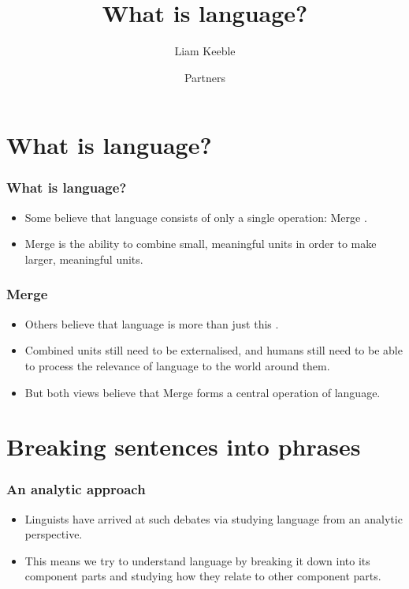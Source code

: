 \documentclass{beamer}
\title{What is language?}
\author{Liam Keeble}
\date{Partners}
\begin{document}
\begin{frame}
\maketitle
\end{frame}

\section{What is language?}

\begin{frame}
	\frametitle{What is language?}
	\begin{itemize}
		\item Some believe that language consists of only a single operation: Merge \cite{hauser2002faculty}.
		\item Merge is the ability to combine small, meaningful units in order to make larger, meaningful units.
		

	\end{itemize}

\end{frame}


\begin{frame}
	\frametitle{Merge}
	\begin{itemize}
		\item Others believe that language is more than just this \cite{jackendoff2005nature}.
	\item Combined units still need to be externalised, and humans still need to be able to process the relevance of language to the world around them.
	\item But both views believe that Merge forms a central operation of language.
	\end{itemize}

\end{frame}


\section{Breaking sentences into phrases}

\begin{frame}
	\frametitle{An analytic approach}
	\begin{itemize}
	\item Linguists have arrived at such debates via studying language from an analytic perspective.
	\item This means we try to understand language by breaking it down into its component parts and studying how they relate to other component parts.

	\end{itemize}

\end{frame}
\end{document}

